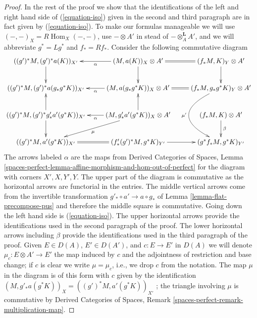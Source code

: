 \documentclass{stacks-project}
\theoremstyle{plain}
\theoremstyle{definition}
\theoremstyle{remark}
\numberwithin{equation}{subsection}
\def\Hom{\mathop{\mathrm{Hom}}\nolimits}
\begin{document}
\begin{proof}
\medskip\noindent
In the rest of the proof we show that the identifications of
the left and right hand side of (\ref{equation-iso})
given in the second and third paragraph are in fact given by
(\ref{equation-iso}). To make our formulas manageable
we will use $(-, -)_X = R\Hom_X(-, -)$, use $- \otimes A'$
in stead of $- \otimes_A^\mathbf{L} A'$, and we will abbreviate
$g^* = Lg^*$ and $f_* = Rf_*$. Consider the following
commutative diagram
$$
\xymatrix{
((g')^*M, (g')^*a(K))_{X'} \ar[d] &
(M, a(K))_X \otimes A' \ar[l]^-\alpha \ar[d] &
(f_*M, K)_Y \otimes A' \ar@{=}[l] \ar[d] \\
((g')^*M, (g')^*a(g_*g^*K))_{X'} &
(M, a(g_*g^*K))_X \otimes A' \ar[l]^-\alpha &
(f_*M, g_*g^*K)_Y \otimes A' \ar@{=}[l] \ar@/_4pc/[dd]_{\mu'} \\
((g')^*M, (g')^*g'_*a'(g^*K))_{X'} \ar[u] \ar[d] &
(M, g'_*a'(g^*K))_X \otimes A' \ar[u] \ar[l]^-\alpha \ar[ld]^\mu &
(f_*M, K) \otimes A' \ar[d]^\beta \\
((g')^*M, a'(g^*K))_{X'} &
(f'_*(g')^*M, g^*K)_{Y'} \ar@{=}[l] \ar[r] &
(g^*f_*M, g^*K)_{Y'}
}
$$
The arrows labeled $\alpha$ are the maps from
Derived Categories of Spaces, Lemma
\ref{spaces-perfect-lemma-affine-morphism-and-hom-out-of-perfect}
for the diagram with corners $X', X, Y', Y$.
The upper part of the diagram is commutative as the horizontal arrows are
functorial in the entries.
The middle vertical arrows come from the invertible transformation
$g'_* \circ a' \to a \circ g_*$  of Lemma \ref{lemma-flat-precompose-pus}
and therefore the middle square is commutative.
Going down the left hand side is (\ref{equation-iso}).
The upper horizontal arrows provide the identifications used in the
second paragraph of the proof.
The lower horizontal arrows including $\beta$ provide the identifications
used in the third paragraph of the proof. Given $E \in D(A)$,
$E' \in D(A')$, and $c : E \to E'$ in $D(A)$ we will denote
$\mu_c : E \otimes A' \to E'$ the map induced by $c$
and the adjointness of restriction and base change;
if $c$ is clear we write $\mu = \mu_c$, i.e., we
drop $c$ from the notation. The map $\mu$ in the diagram is of this
form with $c$ given by the identification
$(M, g'_*a(g^*K))_X = ((g')^*M, a'(g^*K))_{X'}$
; the triangle involving $\mu$ is commutative by
Derived Categories of Spaces, Remark
\ref{spaces-perfect-remark-multiplication-map}.


\end{proof}
\end{document}
